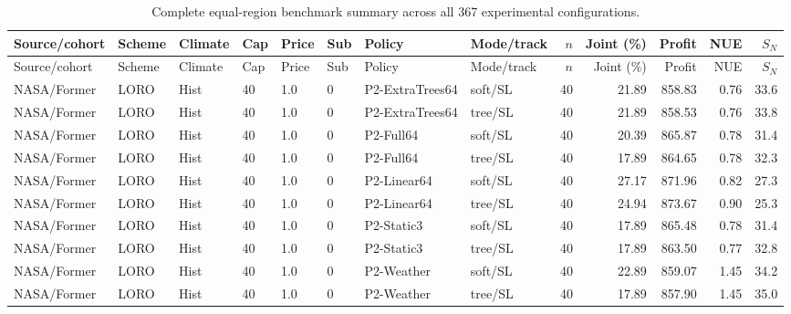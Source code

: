 \documentclass[10pt,a4paper]{article}
\begin{document}
\begin{landscape}\scriptsize\begin{longtable}{llllllllrrrrr}

\caption{Complete equal-region benchmark summary across all 367 experimental configurations.}\\

\toprule Source/cohort & Scheme & Climate & Cap & Price & Sub & Policy & Mode/track & $n$ & Joint (\%) & Profit & NUE & $S_N$ \\\midrule\endfirsthead

\toprule Source/cohort & Scheme & Climate & Cap & Price & Sub & Policy & Mode/track & $n$ & Joint (\%) & Profit & NUE & $S_N$ \\\midrule\endhead

NASA/Former & LORO & Hist & 40 & 1.0 & 0 & P2-ExtraTrees64 & soft/SL & 40 & 21.89 & 858.83 & 0.76 & 33.6 \\

NASA/Former & LORO & Hist & 40 & 1.0 & 0 & P2-ExtraTrees64 & tree/SL & 40 & 21.89 & 858.53 & 0.76 & 33.8 \\

NASA/Former & LORO & Hist & 40 & 1.0 & 0 & P2-Full64 & soft/SL & 40 & 20.39 & 865.87 & 0.78 & 31.4 \\

NASA/Former & LORO & Hist & 40 & 1.0 & 0 & P2-Full64 & tree/SL & 40 & 17.89 & 864.65 & 0.78 & 32.3 \\

NASA/Former & LORO & Hist & 40 & 1.0 & 0 & P2-Linear64 & soft/SL & 40 & 27.17 & 871.96 & 0.82 & 27.3 \\

NASA/Former & LORO & Hist & 40 & 1.0 & 0 & P2-Linear64 & tree/SL & 40 & 24.94 & 873.67 & 0.90 & 25.3 \\

NASA/Former & LORO & Hist & 40 & 1.0 & 0 & P2-Static3 & soft/SL & 40 & 17.89 & 865.48 & 0.78 & 31.4 \\

NASA/Former & LORO & Hist & 40 & 1.0 & 0 & P2-Static3 & tree/SL & 40 & 17.89 & 863.50 & 0.77 & 32.8 \\

NASA/Former & LORO & Hist & 40 & 1.0 & 0 & P2-Weather & soft/SL & 40 & 22.89 & 859.07 & 1.45 & 34.2 \\

NASA/Former & LORO & Hist & 40 & 1.0 & 0 & P2-Weather & tree/SL & 40 & 17.89 & 857.90 & 1.45 & 35.0 \\


\end{longtable}
\end{landscape}
\end{document}

